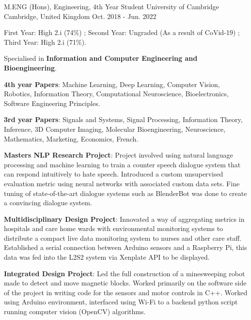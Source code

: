 

\begin{cventries}

  \cventry
    {M.ENG (Hons), Engineering, 4th Year Student} %
    {University of Cambridge} %
    {Cambridge, United Kingdom} %
    {Oct. 2018 - Jun. 2022} %
    {
      \begin{cvitems} %
        \item {First Year: High 2.i (74\%) ; Second Year: Ungraded (As a result of CoVid-19) ; Third Year: High 2.i (71\%).}
        \item {Specialised in \textbf{Information and Computer Engineering and Bioengineering}.}
        \item {\textbf{4th year Papers}: Machine Learning, Deep Learning, Computer Vision, Robotics, Information Theory, Computational Neuroscience, Bioelectronics, Software Engineering Principles.}
        \item {\textbf{3rd year Papers}: Signals and Systems, Signal Processing, Information Theory, Inference, 3D Computer Imaging, Molecular Bioengineering, Neuroscience, Mathematics, Marketing, Economics, French.}
        \item {\textbf{Masters NLP Research Project}: Project involved using natural language processing and machine learning to train a counter speech dialogue system that can respond intuitively to hate speech. Introduced a custom unsupervised evaluation metric using neural networks with associated custom data sets. Fine tuning of state-of-the-art dialogue systems such as BlenderBot was done to create a convincing dialogue system.}
        \item {\textbf{Multidisciplinary Design Project}: Innovated a way of aggregating metrics in hospitals and care home wards with environmental monitoring systems to distribute a compact live data monitoring system to nurses and other care staff. Established a serial connection between Arduino sensors and a Raspberry Pi, this data was fed into the L2S2 system via Xenplate API to be displayed.}
        \item {\textbf{Integrated Design Project}: Led the full construction of a minesweeping robot made to detect and move magnetic blocks. Worked primarily on the software side of the project in writing code for the sensors and motor controls in C++. Worked using Arduino environment, interfaced using Wi-Fi to a backend python script running computer vision (OpenCV) algorithms.}

\end{cvitems}}
\end{cventries}

